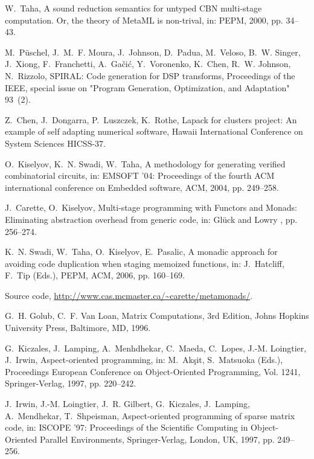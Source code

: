 \documentclass{elsart}
\begin{document}
\begin{thebibliography}{10}
W.~Taha, A sound reduction semantics for untyped {CBN} multi-stage computation.
  {Or}, the theory of {MetaML} is non-trival, in: PEPM, 2000, pp. 34--43.

M.~P{\"u}schel, J.~M.~F. Moura, J.~Johnson, D.~Padua, M.~Veloso, B.~W. Singer,
  J.~Xiong, F.~Franchetti, A.~Ga\v{c}i\'{c}, Y.~Voronenko, K.~Chen, R.~W.
  Johnson, N.~Rizzolo, {SPIRAL}: Code generation for {DSP} transforms,
  Proceedings of the IEEE, special issue on "Program Generation, Optimization,
  and Adaptation" 93~(2).

Z.~Chen, J.~Dongarra, P.~Luszczek, K.~Rothe, Lapack for clusters project: An
  example of self adapting numerical software, Hawaii International Conference
  on System Sciences HICSS-37.

O.~Kiselyov, K.~N. Swadi, W.~Taha, A methodology for generating verified
  combinatorial circuits, in: EMSOFT '04: Proceedings of the fourth ACM
  international conference on Embedded software, ACM, 2004, pp. 249--258.

J.~Carette, O.~Kiselyov, Multi-stage programming with {F}unctors and {M}onads:
  Eliminating abstraction overhead from generic code, in: Gl{\"u}ck and Lowry
  \cite{DBLP:conf/gpce/2005}, pp. 256--274.

K.~N. Swadi, W.~Taha, O.~Kiselyov, E.~Pasalic, A monadic approach for avoiding
  code duplication when staging memoized functions, in: J.~Hatcliff, F.~Tip
  (Eds.), PEPM, ACM, 2006, pp. 160--169.

{Source code}, \url{http://www.cas.mcmaster.ca/~carette/metamonads/}.

G.~H. {Golub}, C.~F. {Van Loan}, Matrix Computations, 3rd Edition, Johns
  Hopkins University Press, Baltimore, MD, 1996.

G.~Kiczales, J.~Lamping, A.~Menhdhekar, C.~Maeda, C.~Lopes, J.-M. Loingtier,
  J.~Irwin, Aspect-oriented programming, in: M.~Ak\c{s}it, S.~Matsuoka (Eds.),
  Proceedings European Conference on Object-Oriented Programming, Vol. 1241,
  Springer-Verlag, 1997, pp. 220--242.

J.~Irwin, J.-M. Loingtier, J.~R. Gilbert, G.~Kiczales, J.~Lamping,
  A.~Mendhekar, T.~Shpeisman, Aspect-oriented programming of sparse matrix
  code, in: ISCOPE '97: Proceedings of the Scientific Computing in
  Object-Oriented Parallel Environments, Springer-Verlag, London, UK, 1997, pp.
  249--256.


\end{thebibliography}
\end{document}
